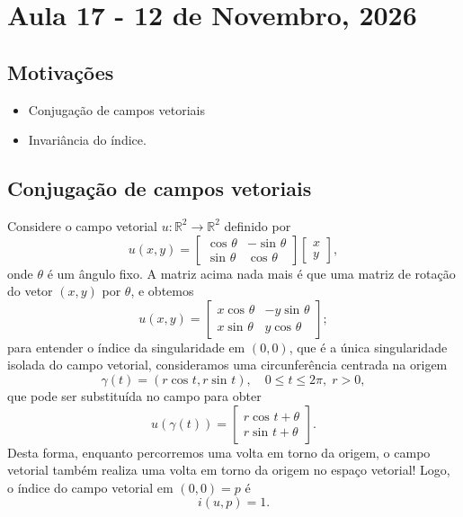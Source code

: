 \documentclass[../differential_topology.tex]{subfiles}
\begin{document}
\section{Aula 17 - 12 de Novembro, 2026}
\subsection{Motivações}
\begin{itemize}
	\item Conjugação de campos vetoriais
	\item Invariância do índice.
\end{itemize}
\subsection{Conjugação de campos vetoriais}
\begin{example}
	Considere o campo vetorial \(u:\mathbb{R}^{2}\rightarrow \mathbb{R}^{2}\) definido por
	\[
		u(x, y) = \begin{bmatrix}
			\cos^{}{\theta } & -\sin^{}{\theta } \\
			\sin^{}{\theta } & \cos^{}{\theta }
		\end{bmatrix} \begin{bmatrix}
			x \\
			y
		\end{bmatrix},
	\]
	onde \(\theta \) é um ângulo fixo. A matriz acima nada mais é que uma matriz de rotação do vetor \((x, y)\) por \(\theta \), e obtemos
	\[
		u(x, y) = \begin{bmatrix}
			x\cos^{}{\theta } & -y\sin^{}{\theta } \\
			x\sin^{}{\theta } & y\cos^{}{\theta }
		\end{bmatrix};
	\]
	para entender o índice da singularidade em \((0, 0)\), que é a única singularidade isolada do campo vetorial, consideramos uma circunferência centrada na origem
	\[
		\gamma (t) = (r\cos^{}{t}, r\sin^{}{t}), \quad 0\leq t \leq 2\pi , \; r > 0,
	\]
	que pode ser substituída no campo para obter
	\[
		u(\gamma (t)) = \begin{bmatrix}
			r\cos^{}{t+\theta } \\
			r\sin^{}{t+\theta }
		\end{bmatrix}.
	\]
	Desta forma, enquanto percorremos uma volta em torno da origem, o campo vetorial também realiza uma volta em torno da origem no espaço vetorial! Logo, o índice do campo vetorial em \((0, 0) = p\) é
	\[
		i(u, p) = 1.
	\]
\end{example}
\end{document}
